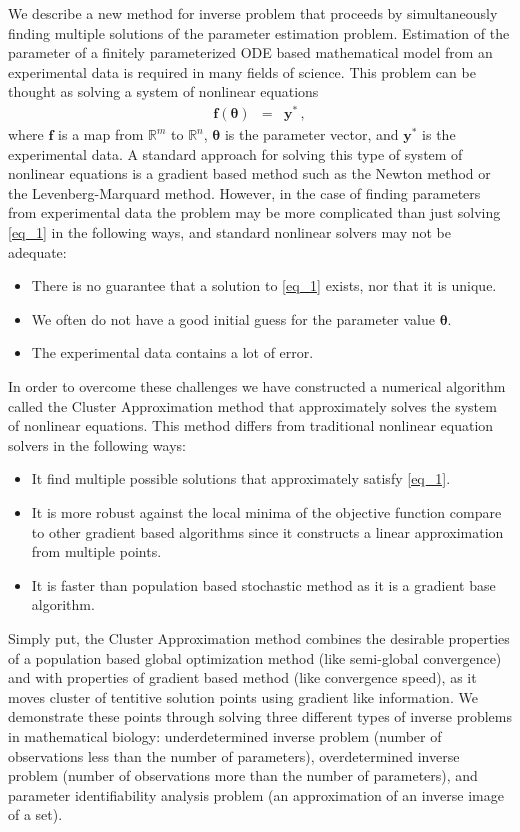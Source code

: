 \documentclass{report}
\begin{document}
We describe a new method for inverse problem that proceeds by
simultaneously finding multiple solutions of the parameter estimation
problem. Estimation of the parameter of a finitely parameterized ODE
based mathematical model from an experimental data is required in many
fields of science. This problem can be thought as solving a system of
nonlinear equations
\begin{eqnarray}
\boldsymbol{f}(\boldsymbol{\theta})&=&\boldsymbol{y}^*\,, \label{eq_1}
\end{eqnarray}
where $\boldsymbol{f}$ is a map from $\mathbb{R}^m$ to $\mathbb{R}^n$,
$\boldsymbol{\theta}$ is the parameter vector, and $\boldsymbol{y}^*$ is
the experimental data. A standard approach for solving this type of
system of nonlinear equations is a gradient based method such as the
Newton method or the Levenberg-Marquard method. However, in the case of
finding parameters from experimental data the problem may be more
complicated than just solving \eqref{eq_1} in the following ways, and
standard nonlinear solvers may not be adequate:
\begin{itemize}
\item There is no guarantee that a solution to \eqref{eq_1} exists, nor
that it is unique.
\item We often do not have a good initial guess for the parameter value
$\boldsymbol{\theta}$.
\item The experimental data contains a lot of error.
\end{itemize}
In order to overcome these challenges we have constructed a numerical
algorithm called the Cluster Approximation method that approximately
solves the system of nonlinear equations. This method differs from
traditional nonlinear equation solvers in the following ways:
\begin{itemize}
\item It find multiple possible solutions that approximately satisfy \eqref{eq_1}.
\item It is more robust against the local minima of the objective
function compare to other gradient based algorithms since it constructs a
linear approximation from multiple points.
\item It is faster than population based stochastic method as it is a
gradient base algorithm.
\end{itemize}
Simply put, the Cluster Approximation method combines the desirable
properties of a population based global optimization method (like
semi-global convergence) and with properties of gradient based method
(like convergence speed), as it moves cluster of tentitive solution
points using gradient like information.
We demonstrate these points through solving three different types of
inverse problems in mathematical biology: underdetermined inverse problem
(number of observations less than the number of parameters),
overdetermined inverse problem (number of observations more than the
number of parameters), and parameter identifiability analysis problem (an
approximation of an inverse image of a set).
\end{document}
